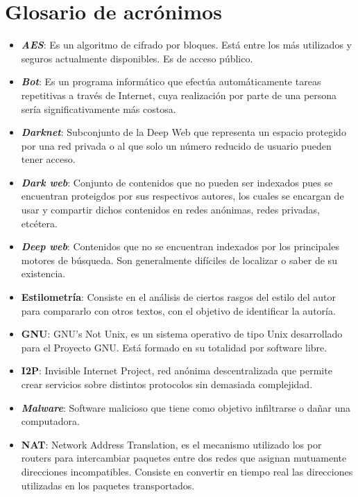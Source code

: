 \chapter*{Glosario de acrónimos}

\begin{itemize}
\item{\textbf{\textit{AES}}: Es un algoritmo de cifrado por bloques. Está entre los más utilizados y seguros actualmente disponibles. Es de acceso público.}	
\item{\textbf{\textit{Bot}}: Es un programa informático que efectúa automáticamente tareas repetitivas a través de Internet, cuya realización por parte de una persona sería significativamente más costosa.}	
\item{\textbf{\textit{Darknet}}: Subconjunto de la Deep Web que representa un espacio protegido por una red privada o al que solo un número reducido de usuario pueden tener acceso.}
\item{\textbf{\textit{Dark web}}: Conjunto de contenidos que no pueden ser indexados pues se encuentran proteigdos por sus respectivos autores, los cuales se encargan de usar y compartir dichos contenidos en redes anónimas, redes privadas, etcétera.}
\item{\textbf{\textit{Deep web}}: Contenidos que no se encuentran indexados por los principales motores de búsqueda. Son generalmente difíciles de localizar o saber de su existencia.}
\item{\textbf{Estilometría}: Consiste en el análisis de ciertos rasgos del estilo del autor para compararlo con otros textos, con el objetivo de identificar la autoría.}
\item{\textbf{GNU}: GNU's Not Unix, es un sistema operativo de tipo Unix desarrollado para el Proyecto GNU. Está formado en su totalidad por software libre.}
\item{\textbf{I2P}: Invisible Internet Project, red anónima descentralizada que permite crear servicios sobre distintos protocolos sin demasiada complejidad.}
\item{\textbf{\textit{Malware}}: Software malicioso que tiene como objetivo infiltrarse o dañar una computadora.}
\item{\textbf{NAT}: Network Address Translation, es el mecanismo utilizado los por routers para intercambiar paquetes entre dos redes que asignan mutuamente direcciones incompatibles. Consiste en convertir en tiempo real las direcciones utilizadas en los paquetes transportados.}

\end{itemize}
